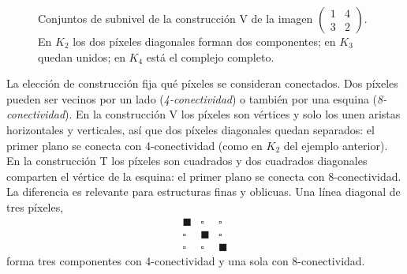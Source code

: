 \begin{figure}[ht]
\centering
{}
\caption{Conjuntos de subnivel de la construcción V de la imagen
$\left(\begin{smallmatrix}1&4\\3&2\end{smallmatrix}\right)$. En $K_2$ los
dos píxeles diagonales forman dos componentes; en $K_3$ quedan unidos; en
$K_4$ está el complejo completo.}
\label{fig:subnivel}
\end{figure}

\begin{observacion}
\label{obs:conectividad}
La elección de construcción fija qué píxeles se consideran conectados.
Dos píxeles pueden ser vecinos por un lado (\emph{4-conectividad}) o
también por una esquina (\emph{8-conectividad}). En la construcción V los
píxeles son vértices y solo los unen aristas horizontales y verticales,
así que dos píxeles diagonales quedan separados: el primer plano se
conecta con 4-conectividad (como en $K_2$ del ejemplo anterior). En la
construcción T los píxeles son cuadrados y dos cuadrados diagonales
comparten el vértice de la esquina: el primer plano se conecta con
8-conectividad. La diferencia es relevante para estructuras finas y
oblicuas. Una línea diagonal de tres píxeles,
\[
  \begin{smallmatrix} \blacksquare & \square & \square\\
                      \square & \blacksquare & \square\\
                      \square & \square & \blacksquare \end{smallmatrix}
\]
forma tres componentes con 4-conectividad y una sola con 8-conectividad.
\end{observacion}

